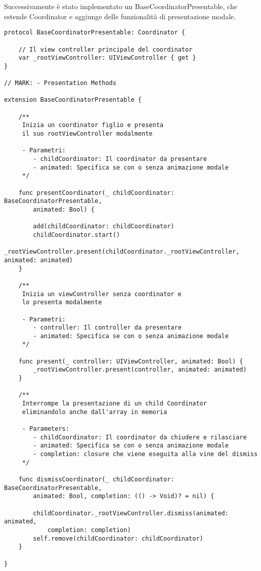 Successivamente è stato implementato un BaseCoordinatorPresentable, che estende Coordinator
e aggiunge delle funzionalità di presentazione modale.

\begin{verbatim}
protocol BaseCoordinatorPresentable: Coordinator {

    // Il view controller principale del coordinator
    var _rootViewController: UIViewController { get }
}

// MARK: - Presentation Methods

extension BaseCoordinatorPresentable {
    
    /**
     Inizia un coordinator figlio e presenta
     il suo rootViewController modalmente

     - Parametri:
        - childCoordinator: Il coordinator da presentare
        - animated: Specifica se con o senza animazione modale
     */
    
    func presentCoordinator(_ childCoordinator: BaseCoordinatorPresentable,
        animated: Bool) {

        add(childCoordinator: childCoordinator)
        childCoordinator.start()
        _rootViewController.present(childCoordinator._rootViewController, animated: animated)
    }
    
    /**
     Inizia un viewController senza coordinator e
     lo presenta modalmente
     
     - Parametri:
        - controller: Il controller da presentare
        - animated: Specifica se con o senza animazione modale
     */
    
    func present(_ controller: UIViewController, animated: Bool) {
        _rootViewController.present(controller, animated: animated)
    }
    
    /**
     Interrompe la presentazione di un child Coordinator
     eliminandolo anche dall'array in memoria

     - Parameters:
        - childCoordinator: Il coordinator da chiudere e rilasciare
        - animated: Specifica se con o senza animazione modale
        - completion: closure che viene eseguita alla vine del dismiss
     */
    
    func dismissCoordinator(_ childCoordinator: BaseCoordinatorPresentable,
        animated: Bool, completion: (() -> Void)? = nil) {

        childCoordinator._rootViewController.dismiss(animated: animated,
            completion: completion)
        self.remove(childCoordinator: childCoordinator)
    }

}
\end{verbatim}

